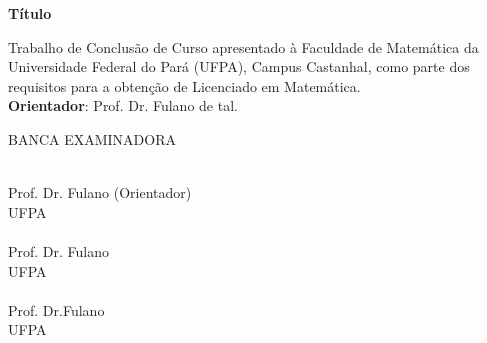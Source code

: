\newpage
\begin{center}
	
	\vspace{3cm}
	
	{\Large{\textbf{\singlespacing Título}}}
\end{center}

\vspace{1cm}
\begin{flushright}
	\begin{minipage}{.5 \linewidth}
		\singlespacing
		Trabalho de Conclusão de Curso apresentado
		à Faculdade de Matemática da Universidade
		Federal do Pará (UFPA), Campus Castanhal,
		como parte dos requisitos para a obtenção de
		Licenciado em \mbox{Matemática}. \\
		\textbf{Orientador}: Prof. Dr. Fulano de tal.
	\end{minipage}
\end{flushright}

\vspace{3cm}
\begin{center}
	BANCA EXAMINADORA
\end{center}
\vspace{1.cm}

\begin{center}
	\begin{minipage}[c]{15cm}
		\begin{center}
			\uline{\hspace{14cm}} \\
			Prof. Dr. Fulano (Orientador) \\ UFPA \\
			\vspace{1cm}
			\uline{\hspace{14cm}} \\
			Prof. Dr. Fulano \\ UFPA \\
			\vspace{1cm}
			\uline{\hspace{14cm}} \\
			Prof. Dr.Fulano \\ UFPA
			
		\end{center}
	\end{minipage}
\end{center}
